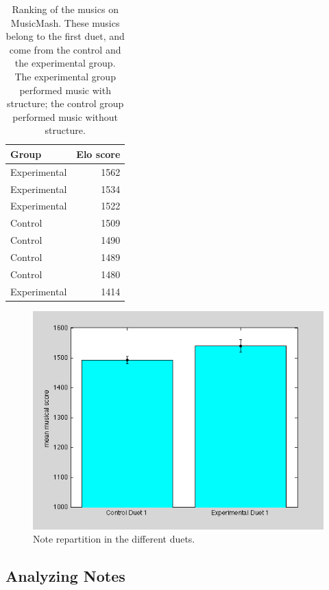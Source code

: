 \documentclass{article}
\begin{document}
\begin{table}[tb]
\begin{center}
\begin{tabular}{l r}
Group & Elo score \\
\hline
Experimental & 1562 \\
Experimental & 1534 \\
Experimental & 1522 \\
Control & 1509 \\
Control & 1490 \\
Control & 1489 \\
Control & 1480 \\
Experimental & 1414 \\
\end{tabular}
\caption{Ranking of the musics on MusicMash. These musics belong to the first duet, and come from the control and the experimental group. The experimental group performed music with structure; the control group performed music without structure.} 
\label{musicmash-results}
\end{center}
\end{table}

\begin{figure}[tb]
\includegraphics[width=\columnwidth]{music-scores-bar-graph.png}
\caption{Note repartition in the different duets.} 
\label{survey-results}
\end{figure}


\subsection{Analyzing Notes}
\end{document}
